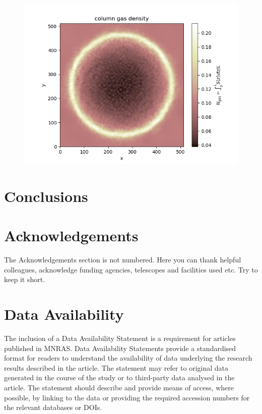 \documentclass[fleqn,usenatbib]{mnras}
\begin{document}
\begin{figure}
{      \includegraphics{3Dsedov_SN_dust_newsetup2_10pc_chi4_512_FGupd_new_n01_uin2_column_gasVAR20.jpg}}

  \caption{\label{3Dsedov} }
  \end{figure} 

\section{Conclusions}


\section*{Acknowledgements}

The Acknowledgements section is not numbered. Here you can thank helpful
colleagues, acknowledge funding agencies, telescopes and facilities used etc.
Try to keep it short.

\section*{Data Availability}

 
The inclusion of a Data Availability Statement is a requirement for articles published in MNRAS. Data Availability Statements provide a standardised format for readers to understand the availability of data underlying the research results described in the article. The statement may refer to original data generated in the course of the study or to third-party data analysed in the article. The statement should describe and provide means of access, where possible, by linking to the data or providing the required accession numbers for the relevant databases or DOIs.
\end{document}
